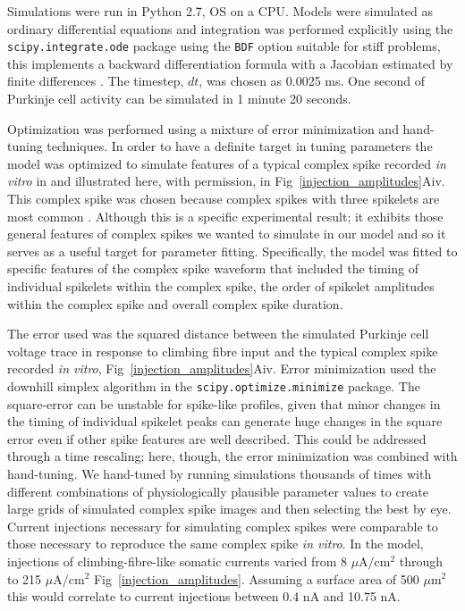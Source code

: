 \documentclass[utf8]{frontiersSCNS} %
\begin{document}
Simulations were run in Python 2.7, OS on a CPU. Models were simulated
as ordinary differential equations and integration was performed
explicitly using the \texttt{scipy.integrate.ode} package using the
\texttt{BDF} option suitable for stiff problems, this implements a
backward differentiation formula with a Jacobian estimated by finite
differences \cite{ByrneHindmarsh1975}. The timestep, $dt$, was chosen
as 0.0025 ms. One second of Purkinje cell activity can be simulated in
1 minute 20 seconds.

Optimization was performed using a mixture of error minimization and
hand-tuning techniques. In order to have a definite
target in tuning parameters the model was optimized to simulate
features of a typical complex spike recorded \textit{in vitro} in
\cite{DavieEtAl2008} and illustrated here, with permission, in
Fig~\ref{injection_amplitudes}Aiv. This complex spike was chosen
because complex spikes with three spikelets are most common
\cite{BurroughsEtAl2016}. Although this is a specific experimental
result; it exhibits those general features of complex spikes we wanted
to simulate in our model and so it serves as a useful target for
parameter fitting. Specifically, the model was fitted to specific
features of the complex spike waveform that included the timing of
individual spikelets within the complex spike, the order of spikelet
amplitudes within the complex spike and overall complex spike
duration.

The error used was the squared distance between the simulated Purkinje
cell voltage trace in response to climbing fibre input and the typical
complex spike recorded \textit{in vitro},
Fig~\ref{injection_amplitudes}Aiv. Error minimization used the
downhill simplex algorithm in the \texttt{scipy.optimize.minimize}
package. The square-error can be unstable for spike-like profiles,
given that minor changes in the timing of individual spikelet peaks
can generate huge changes in the square error even if other spike
features are well described. This could be addressed through a time
rescaling; here, though, the error minimization was combined with
hand-tuning. We hand-tuned by running simulations thousands of times
with different combinations of physiologically plausible parameter
values to create large grids of simulated complex spike images and
then selecting the best by eye. Current injections necessary for
simulating complex spikes were comparable to those necessary to
reproduce the same complex spike \textit{in vitro}. In the model,
injections of climbing-fibre-like somatic currents varied from 8
$\mu$A$/$cm$^2$ through to 215 $\mu$A$/$cm$^2$
Fig~\ref{injection_amplitudes}. Assuming a surface area of 500
$\mu$m$^2$ this would correlate to current injections between 0.4 nA
and 10.75 nA.
\end{document}

